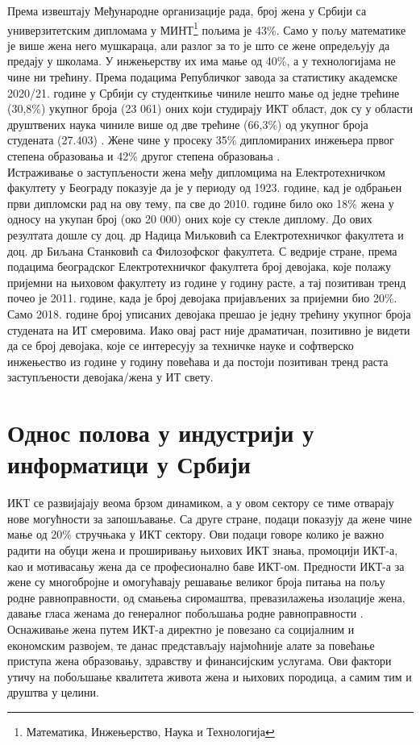 \documentclass[a4paper]{article}
\begin{document}
Према извештају Међународне организације рада, број жена у Србији са универзитетским 
дипломама у МИНТ\footnote{Математика, Инжењерство, Наука и Технологија} пољима је 43\%.
Само у пољу математике је више жена него мушкараца, али разлог за то је што се 
жене опредељују да предају у школама. У инжењерству их има мање од 40\%, а у 
технологијама не чине ни трећину. Према подацима Републичког завода за статистику академске 
2020/21. године у Србији су студенткиње чиниле нешто мање од једне трећине (30,8\%) укупног броја 
(23 061) оних који студирају ИКТ област, док су у области друштвених наука чиниле више од две 
трећине (66,3\%) од укупног броја студената (27.403) \cite{startup_infos}. Жене чине у просеку 
35\% дипломираних инжењера првог степена образовања и 42\% другог степена образовања 
\cite{vlada_ikt}.\\

Истраживање о заступљености жена међу дипломцима на Електротехничком факултету у Београду 
показује да је у периоду од 1923. године, кад је одбрањен први дипломски рад на 
ову тему, па све до 2010. године било око 18\% жена у односу на укупан број 
(око 20 000) оних које су стекле диплому. До ових резултата дошле су доц. др Надица 
Миљковић са Електротехничког факултета и доц. др Биљана Станковић са Филозофског факултета. С 
ведрије стране, према подацима београдског Електротехничког факултета број девојака, које полажу 
пријемни на њиховом факултету из године у годину расте, а тај позитиван тренд почео 
је 2011. године, када је број девојака пријављених за пријемни био 20\%. 
Само 2018. године број уписаних девојака прешао је једну трећину укупног броја студената на ИТ 
смеровима. Иако овај раст није драматичан, позитивно је видети да се број девојака, које се 
интересују за техничке науке и софтверско инжењество из године у годину повећава и да постоји 
позитиван тренд раста заступљености девојака/жена у ИТ свету.

\section{Однос полова у индустрији у информатици у Србији}

ИКТ се развијајају веома брзом динамиком, а у овом сектору се тиме отварају нове могућности за 
запошљавање. Са друге стране, подаци показују да жене чине мање од 20\% стручњака у ИКТ сектору. 
Ови подаци говоре колико је важно радити на обуци жена и проширивању њихових ИКТ знања, промоцији 
ИКТ-а, као и мотивасању жена да се професионално баве ИКТ-ом. Предности ИКТ-а за жене су 
многобројне и омогућавају решавање великог броја питања на пољу родне равноправности, од смањења 
сиромаштва, превазилажења изолације жена, давање гласа женама до генералног побољшања родне 
равноправности \cite{vlada_ikt}. Оснаживање жена путем ИКТ-а директно је повезано са социјалним и
економским развојем, те данас представљају најмоћније алате за повећање приступа жена образовању, 
здравству и финансијским услугама. Ови фактори утичу на побољшање квалитета живота жена и њихових 
породица, а самим тим и друштва у целини. \\
\end{document}
